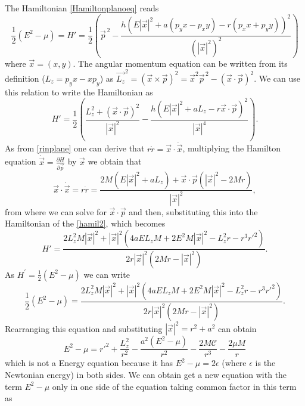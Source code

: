 \begin{Proof}
 The Hamiltonian \ref{Hamiltonplanoeq} reads
 \begin{equation}
  \frac{1}{2} \left( E^2-\mu \right)= H'=\frac{1}{2} \left(\vec{p}^{\,2}-\frac{h \left(E |\vec{x}|^2 +a (p_y x-p_x y)-r (p_x x+p_y y)\right)^2}{(|\vec{x}|^2)^2}\right)
 \end{equation}
 where $\vec{x}=(x,y)$. The angular momentum equation can be written from its definition ($L_z= p_y x - x p_y$) as $\vec{L_z}^2=(\vec{x} \times \vec{p})^2=\vec{x}^2 \vec{p}^{\,2}-(\vec{x} \cdot \vec{p})^2 $. We can use this relation to write the Hamiltonian as
 \begin{equation}\label{hamil2}
  H'=\frac{1}{2} \left(\frac{L_z^2+(\vec{x} \cdot \vec{p})^2}{|\vec{x}|^2}-\frac{h \left(E |\vec{x}|^2 +a L_z-r \vec{x} \cdot \vec{p}\right)^2}{|\vec{x}|^4}\right).
 \end{equation}
As from \cref{rinplane} one can derive that $r \dot{r} = \vec{x} \cdot \dot{\vec{x}}$, multiplying the Hamilton equation $\dot{\vec{x}}=\frac{\partial H}{\partial \vec{p}}$ by $\vec{x}$ we obtain that
\begin{equation}
 \vec{x} \cdot \dot{\vec{x}}=r \dot{r}=\frac{2 M \left(E |\vec{x}|^2 +a L_z\right)+\vec{x} \cdot \vec{p} (|\vec{x}|^2-2 M r)}{|\vec{x}|^2},
\end{equation}
from where we can solve for $\vec{x} \cdot \vec{p}$ and then, substituting this into the Hamiltonian of the \cref{hamil2}, which becomes
\begin{equation}
  H'= \frac{2 L_z^2 M |\vec{x}|^2+|\vec{x}|^2 \left(4 a E L_z M +2 E^2 M |\vec{x}|^2-L_z^2 r-r^3 r'^2\right)}{2 r |\vec{x}|^2 (2 M r-|\vec{x}|^2)}.
\end{equation}
As $H^{\prime}= \frac{1}{2}\left(E^2-\mu \right)$ we can write
\begin{equation}
\frac{1}{2}\left(E^2-\mu \right)=\frac{2 L_z^2 M |\vec{x}|^2+|\vec{x}|^2 \left(4 a E L_z M +2 E^2 M |\vec{x}|^2-L_z^2 r-r^3 r'^2 \right)}{2 r |\vec{x}|^2 (2 M r-|\vec{x}|^2)}.
\end{equation}
Rearranging this equation and substituting $|\vec{x}|^2=r^2+a^2$ can obtain
\begin{equation}
 E^2-\mu= r'^2+\frac{L_z^2}{r^2}-\frac{a^2 \left( E^2- \mu \right)}{r^2}-\frac{2 M \mathcal{C}}{r^3}-\frac{2 \mu  M}{r}
\end{equation}
which is not a Energy equation because it has $ E^2-\mu=2\epsilon$ (where $\epsilon$ is the Newtonian energy) in both sides. We can obtain get a new equation with the term $ E^2-\mu$ only in one side of the equation taking common factor in this term as

\end{Proof}
